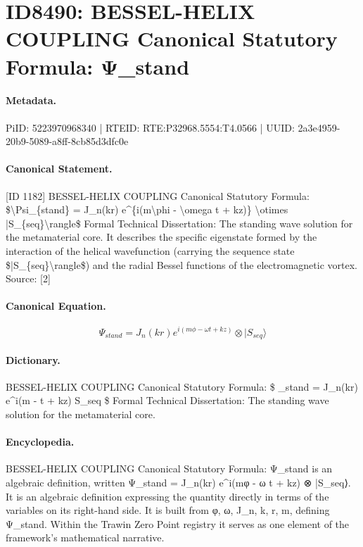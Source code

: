 \section*{ID8490: BESSEL-HELIX COUPLING Canonical Statutory Formula: Ψ\_stand}
\paragraph{Metadata.}
PiID: 5223970968340 | RTEID: RTE:P32968.5554:T4.0566 | UUID: 2a3e4959-20b9-5089-a8ff-8cb85d3dfc0e

\paragraph{Canonical Statement.}
[ID 1182] BESSEL-HELIX COUPLING Canonical Statutory Formula: \$\textbackslash{}Psi\_\{stand\} = J\_n(kr) e\textasciicircum{}\{i(m\textbackslash{}phi - \textbackslash{}omega t + kz)\} \textbackslash{}otimes |S\_\{seq\}\textbackslash{}rangle\$ Formal Technical Dissertation: The standing wave solution for the metamaterial core. It describes the specific eigenstate formed by the interaction of the helical wavefunction (carrying the sequence state \$|S\_\{seq\}\textbackslash{}rangle\$) and the radial Bessel functions of the electromagnetic vortex. Source: [2]

\paragraph{Canonical Equation.}
\[
\Psi_{stand} = J_n(kr) e^{i(m\phi - \omega t + kz)} \otimes |S_{seq}\rangle
\]

\paragraph{Dictionary.}
BESSEL-HELIX COUPLING Canonical Statutory Formula: \$ \_stand = J\_n(kr) e\textasciicircum{}i(m - t + kz) S\_seq \$ Formal Technical Dissertation: The standing wave solution for the metamaterial core.

\paragraph{Encyclopedia.}
BESSEL-HELIX COUPLING Canonical Statutory Formula: Ψ\_stand is an algebraic definition, written Ψ\_stand = J\_n(kr) e\textasciicircum{}i(mφ - ω t + kz) ⊗ |S\_seq⟩. It is an algebraic definition expressing the quantity directly in terms of the variables on its right-hand side. It is built from φ, ω, J\_n, k, r, m, defining Ψ\_stand. Within the Trawin Zero Point registry it serves as one element of the framework's mathematical narrative.
